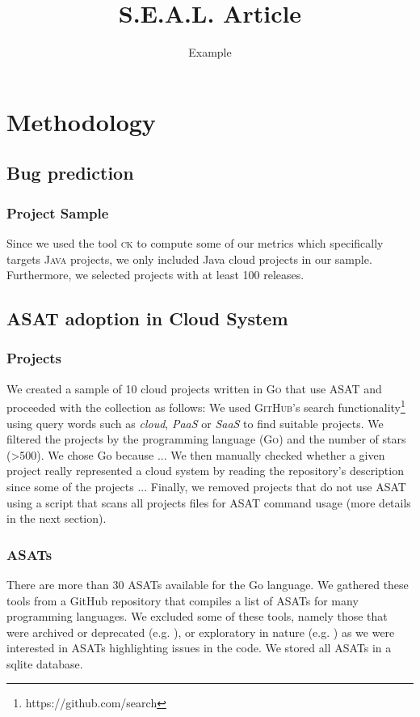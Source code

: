 \documentclass{seal_article}
\title{S.E.A.L. Article}
\subtitle{Example}
\begin{document}
\maketitle

\section{Methodology}

\subsection{Bug prediction}
\subsubsection{Project Sample}
Since we used the tool \textsc{ck} \cite{ck} to compute some of our metrics which specifically targets \textsc{Java} projects, we only included Java cloud projects in our sample. Furthermore, we selected projects with at least 100 releases.

\subsection{ASAT adoption in Cloud System}

\subsubsection{Projects}
We created a sample of 10 cloud projects written in \textsc{Go} that use ASAT and proceeded with the collection as follows: We used \textsc{GitHub}'s search functionality\footnote{https://github.com/search} using query words such as \textit{cloud}, \textit{PaaS} or \textit{SaaS} to find suitable projects. We filtered the projects by the programming language (\textsc{Go}) and the number of stars (>500). We chose Go because ... We then manually checked whether a given project really represented a cloud system by reading the repository's description since some of the projects ... Finally, we removed projects that do not use ASAT using a script that scans all projects files for ASAT command usage (more details in the next section).

\subsubsection{ASATs}
There are more than 30 ASATs available for the Go language. We gathered these tools from a GitHub repository \cite{awesome_asat} that compiles a list of ASATs for many programming languages. We excluded some of these tools, namely those that were archived or deprecated (e.g. \cite{interfacer}), or exploratory in nature (e.g. \cite{goroutine}) as we were interested in ASATs highlighting issues in the code. We stored all ASATs in a sqlite database.
\end{document}
